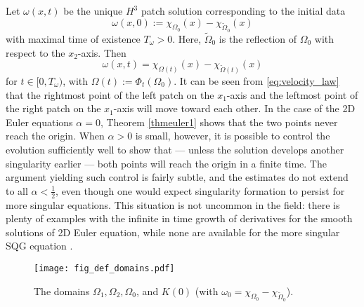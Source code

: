 \documentclass[reqno,centertags, 11pt]{amsart}
\begin{document}
Let $\omega(x,t)$ be the  unique $H^3$ patch solution corresponding to the initial data
\begin{equation}
\omega(x,0) := \chi_{\Omega_0}(x) - \chi_{\tilde{\Omega}_0}(x)
\label{def:omega_0}
\end{equation}
with maximal time of existence $T_\omega>0$.
Here, $\tilde{\Omega}_0$ is the reflection of $\Omega_0$ with respect to the $x_2$-axis.
Then
\begin{equation} \label{6.0}
\omega(x, t) = \chi_{\Omega(t)}(x) - \chi_{\tilde{\Omega}(t)}(x)
\end{equation}
for $t\in[0,T_\omega)$, with $\Omega (t):=\Phi_t(\Omega_0).$ %
It can be seen from \eqref{eq:velocity_law} that the rightmost point of the left patch on the $x_1$-axis and
the leftmost point of the right patch on the $x_1$-axis will move toward each other. %
In the case of the 2D Euler equations $\alpha=0$, Theorem \ref{thmeuler1} shows that the two points never reach the origin.
When $\alpha>0$ is small, however, it is possible to control the evolution sufficiently well to show that --- unless the solution develops another
singularity earlier --- both points will reach the origin in a finite time. The argument yielding such control is fairly subtle, and
the estimates do not extend to all $\alpha<\frac 12$, even though one would expect singularity formation to persist for more singular equations.
This situation is not uncommon in the field: there is plenty of examples with the infinite in time growth of derivatives for the
smooth solutions of 2D Euler equation, while none are available for the more singular SQG equation \cite{KN5}.

\begin{figure}
\begin{center}
\texttt{[image: fig\_def\_domains.pdf]}
\end{center}
\caption{The domains $\Omega_1, \Omega_2, \Omega_0$, and $K(0)$ (with $\omega_0=\chi_{\Omega_0}-\chi_{\tilde  \Omega_0}$). \label{fig:def_domains}}
\end{figure}
\end{document}
